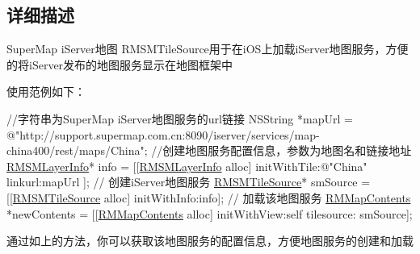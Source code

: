 \subsection{详细描述}
Super\-Map i\-Server地图 R\-M\-S\-M\-Tile\-Source用于在i\-O\-S上加载i\-Server地图服务，方便的将i\-Server发布的地图服务显示在地图框架中 \par
 使用范例如下： 


\begin{DoxyCode}
\textcolor{comment}{//字符串为SuperMap iServer地图服务的url链接}
NSString *mapUrl = \textcolor{stringliteral}{@"http://support.supermap.com.cn:8090/iserver/services/map-china400/rest/maps/China"};
\textcolor{comment}{//创建地图服务配置信息，参数为地图名和链接地址}
\hyperlink{interface_r_m_s_m_layer_info}{RMSMLayerInfo}* info = [[\hyperlink{interface_r_m_s_m_layer_info}{RMSMLayerInfo} alloc] initWithTile:\textcolor{stringliteral}{@"China"} linkurl:mapUrl
      ];
\textcolor{comment}{// 创建iServer地图服务}
\hyperlink{interface_r_m_s_m_tile_source}{RMSMTileSource}* smSource = [[\hyperlink{interface_r_m_s_m_tile_source}{RMSMTileSource} alloc] initWithInfo:info];
\textcolor{comment}{// 加载该地图服务}
\hyperlink{interface_r_m_map_contents}{RMMapContents} *newContents = [[\hyperlink{interface_r_m_map_contents}{RMMapContents} alloc] initWithView:\textcolor{keyword}{self} tilesource:
      smSource];
\end{DoxyCode}
 通过如上的方法，你可以获取该地图服务的配置信息，方便地图服务的创建和加载 

